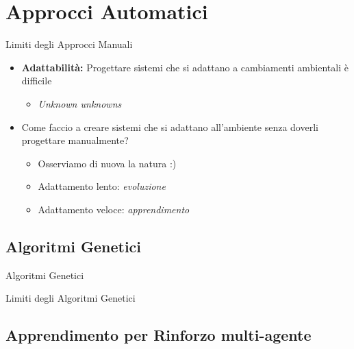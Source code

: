 \documentclass[presentation, 10pt,aspectratio=169]{beamer}\mode<presentation>{\usetheme{AMSBolognaFC}}
\begin{document}
\section{Approcci Automatici}
\begin{frame}{Limiti degli Approcci Manuali}
	\begin{itemize}
		\item \textbf{Adattabilità:} Progettare sistemi che si adattano a cambiamenti ambientali è difficile
		\begin{itemize}
			\item \emph{Unknown unknowns}
		\end{itemize}
		\item Come faccio a creare sistemi che si adattano all'ambiente senza doverli progettare manualmente?
		\begin{itemize}
			\item Osserviamo di nuova la natura :)
			\item Adattamento lento: \emph{evoluzione}
			\item Adattamento veloce: \emph{apprendimento}
		\end{itemize}
	\end{itemize}
\end{frame}
	\subsection{Algoritmi Genetici}
\begin{frame}{Algoritmi Genetici}

\end{frame}
\begin{frame}{Limiti degli Algoritmi Genetici}
\end{frame}
	\subsection{Apprendimento per Rinforzo multi-agente}
\end{document}
